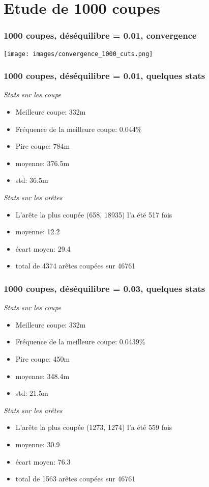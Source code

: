 \documentclass[aspectratio=169]{beamer}
\begin{document}
    \section{Etude de 1000 coupes}
    
    \begin{frame}
        \frametitle{1000 coupes, déséquilibre = 0.01, convergence}
        \begin{center}
            \texttt{[image: images/convergence\_1000\_cuts.png]}
        \end{center}
    \end{frame}

    \begin{frame}
        \frametitle{1000 coupes, déséquilibre = 0.01, quelques stats}
        \emph{Stats sur les coupe}
        \begin{itemize}
            \item Meilleure coupe: 332m
            \item Fréquence de la meilleure coupe: 0.044\%
            \item Pire coupe: 784m
            \item moyenne: 376.5m
            \item std: 36.5m
        \end{itemize}
        \emph{Stats sur les arêtes}
        \begin{itemize}
            \item L'arête la plus coupée (658, 18935) l'a été 517 fois
            \item moyenne: 12.2
            \item écart moyen: 29.4
            \item total de 4374 arêtes coupées sur 46761
        \end{itemize}
    \end{frame}

    \begin{frame}
        \frametitle{1000 coupes, déséquilibre = 0.03, quelques stats}
        \emph{Stats sur les coupe}
        \begin{itemize}
            \item Meilleure coupe: 332m
            \item Fréquence de la meilleure coupe: 0.0439\%
            \item Pire coupe: 450m
            \item moyenne: 348.4m
            \item std: 21.5m
        \end{itemize}
        \emph{Stats sur les arêtes}
        \begin{itemize}
            \item L'arête la plus coupée (1273, 1274) l'a été 559 fois
            \item moyenne: 30.9
            \item écart moyen: 76.3
            \item total de 1563 arêtes coupées sur 46761
        \end{itemize} 
    \end{frame}
\end{document}
